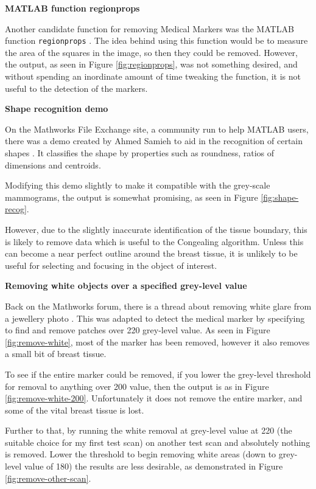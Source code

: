 \textbf{MATLAB function regionprops}

Another candidate function for removing Medical Markers was the MATLAB function \texttt{regionprops} \cite{regionprops}. The idea behind using this function would be to measure the area of the squares in the image, so then they could be removed. However, the output, as seen in Figure \ref{fig:regionprops}, was not something desired, and without spending an inordinate amount of time tweaking the function, it is not useful to the detection of the markers.

\textbf{Shape recognition demo}

On the Mathworks File Exchange site, a community run to help MATLAB users, there was a demo created by Ahmed Samieh to aid in the recognition of certain shapes \cite{shape_recognition}. It classifies the shape by properties such as roundness, ratios of dimensions and centroids.

Modifying this demo slightly to make it compatible with the grey-scale mammograms, the output is somewhat promising, as seen in Figure \ref{fig:shape-recog}.

However, due to the slightly inaccurate identification of the tissue boundary, this is likely to remove data which is useful to the \Gls{Congealing} algorithm. Unless this can become a near perfect outline around the breast tissue, it is unlikely to be useful for selecting and focusing in the object of interest.

\textbf{Removing white objects over a specified grey-level value}

Back on the Mathworks forum, there is a thread about removing white glare from a jewellery photo \cite{remove_white}. This was adapted to detect the medical marker by specifying to find and remove patches over 220 grey-level value. As seen in Figure \ref{fig:remove-white}, most of the marker has been removed, however it also removes a small bit of breast tissue.

To see if the entire marker could be removed, if you lower the grey-level threshold for removal to anything over 200 value, then the output is as in Figure \ref{fig:remove-white-200}. Unfortunately it does not remove the entire marker, and some of the vital breast tissue is lost.

Further to that, by running the white removal at grey-level value at 220 (the suitable choice for my first test scan) on another test scan and absolutely nothing is removed. Lower the threshold to begin removing white areas (down to grey-level value of 180) the results are less desirable, as demonstrated in Figure \ref{fig:remove-other-scan}.

